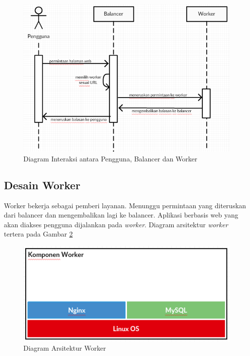 \documentclass{ta-its}
\begin{document}
			    \begin{figure}[] %
			    	\centering
			    	\includegraphics[width=\linewidth]{contoh_img/kerjabalancer}
			    	\caption{Diagram Interaksi antara Pengguna, Balancer dan Worker}
			    	\label{gambarKerjaBalancer}
			    \end{figure}
			
			\subsection{Desain Worker}
				Worker bekerja sebagai pemberi layanan. Menunggu permintaan yang diteruskan dari balancer dan mengembalikan lagi ke balancer. Aplikasi berbasis web yang akan diakses pengguna dijalankan pada \textit{worker}. Diagram arsitektur \textit{worker} tertera pada Gambar \ref{gambarArsitekturWorker}
				
				\begin{figure}[] %
					\centering
					\includegraphics[width=\linewidth]{contoh_img/kompworker}
					\caption{Diagram Arsitektur Worker}
					\label{gambarArsitekturWorker}
				\end{figure}
				
\end{document}
